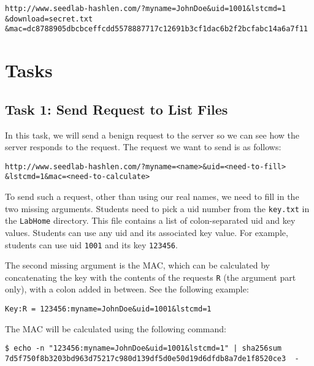 \begin{lstlisting}
http://www.seedlab-hashlen.com/?myname=JohnDoe&uid=1001&lstcmd=1
&download=secret.txt
&mac=dc8788905dbcbceffcdd5578887717c12691b3cf1dac6b2f2bcfabc14a6a7f11
\end{lstlisting}



\section{Tasks}


\subsection{Task 1: Send Request to List Files}

In this task, we will send a benign request to the server so we
can see how the server responds to the request. The request we want to send
is as follows:

\begin{lstlisting}
http://www.seedlab-hashlen.com/?myname=<name>&uid=<need-to-fill>
&lstcmd=1&mac=<need-to-calculate>
\end{lstlisting}

To send such a request, other than using our real names, we need to fill in the 
two missing arguments. Students need
to pick a uid number from the \texttt{key.txt} in the \texttt{LabHome}
directory. This file contains a list of colon-separated uid and key values. Students
can use any uid and its associated key value. For example, students can use uid
\texttt{1001} and its key \texttt{123456}.

The second missing argument is the MAC, which can be calculated by
concatenating the key with the contents of the requests \texttt{R} 
(the argument part only), with a colon added in between. 
See the following example:
 
\begin{lstlisting}
Key:R = 123456:myname=JohnDoe&uid=1001&lstcmd=1
\end{lstlisting}
 
The MAC will be calculated using the following command:

\begin{lstlisting}
$ echo -n "123456:myname=JohnDoe&uid=1001&lstcmd=1" | sha256sum
7d5f750f8b3203bd963d75217c980d139df5d0e50d19d6dfdb8a7de1f8520ce3  -
\end{lstlisting}

